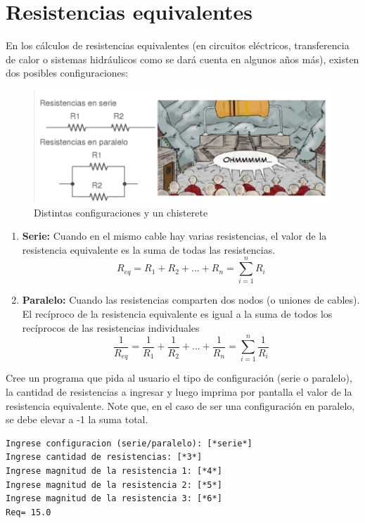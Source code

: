 \section{Resistencias equivalentes}
En los cálculos de resistencias equivalentes (en circuitos eléctricos, transferencia de calor o sistemas hidráulicos como se dará cuenta en algunos años más), existen dos posibles configuraciones:
\begin{figure}[h]
    \centering
    \includegraphics[scale=0.7]{Guia/resistencias.png}
    \caption{Distintas configuraciones y un chisterete}
\end{figure}
\begin{enumerate}
    \item \textbf{Serie:} Cuando en el mismo cable hay varias resistencias, el valor de la resistencia equivalente es la suma de todas las resistencias.
    \begin{equation}
        R_{eq}=R_1+R_2+...+R_n=\sum_{i=1}^n R_i
    \end{equation}
    \item \textbf{Paralelo:} Cuando las resistencias comparten dos nodos (o uniones de cables). El recíproco de la resistencia equivalente es igual a la suma de todos los recíprocos de las resistencias individuales
    \begin{equation}
        \frac{1}{R_{eq}}=\frac{1}{R_1}+\frac{1}{R_2}+...+\frac{1}{R_n}=\sum_{i=1}^n \frac{1}{R_i}
    \end{equation}
\end{enumerate}
Cree un programa que pida al usuario el tipo de configuración (serie o paralelo), la cantidad de resistencias a ingresar y luego imprima por pantalla el valor de la resistencia equivalente. Note que, en el caso de ser una configuración en paralelo, se debe elevar a -1 la suma total. 
\begin{lstlisting}[style=consola]
Ingrese configuracion (serie/paralelo): [*serie*]
Ingrese cantidad de resistencias: [*3*]
Ingrese magnitud de la resistencia 1: [*4*]
Ingrese magnitud de la resistencia 2: [*5*]
Ingrese magnitud de la resistencia 3: [*6*]
Req= 15.0
\end{lstlisting}

